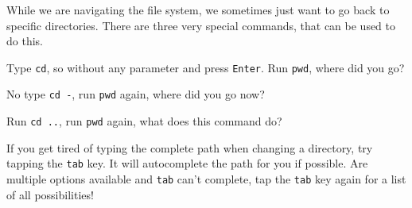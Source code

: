 \begin{challenge}
    \begin{task}
    While we are navigating the file system, we sometimes just want to go back to specific directories.
    There are three very special commands, that can be used to do this.
        \begin{questions}
            \item Type \texttt{cd}, so without any parameter and press \texttt{Enter}. Run \texttt{pwd}, where did you go?
            \item No type \texttt{cd -}, run \texttt{pwd} again, where did you go now?
            \item Run \texttt{cd ..}, run \texttt{pwd} again, what does this command do?
        \end{questions}
    \end{task}
    \begin{advise}
        If you get tired of typing the complete path when changing a directory, try tapping the \texttt{tab} key.
        It will autocomplete the path for you if possible.
        Are multiple options available and \texttt{tab} can't complete, tap the \texttt{tab} key again for a list of all possibilities!
    \end{advise}
\end{challenge}
    